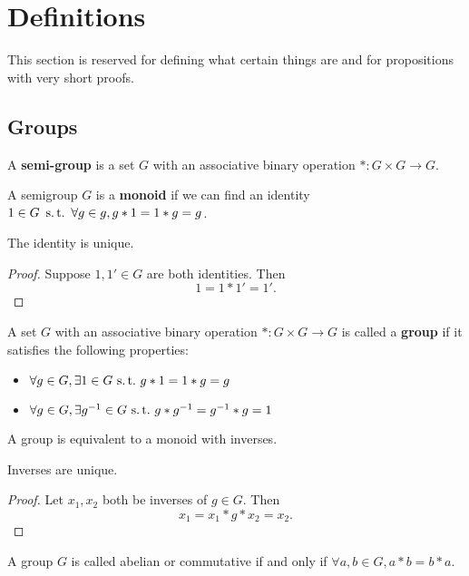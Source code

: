 \section{Definitions}
This section is reserved for defining what certain things are and for
propositions with very short proofs.

\subsection{Groups}
\begin{df}
A \textbf{semi-group} is a set $G$ with an associative binary operation $* : G
\times G \rightarrow G$.
\end{df}

\begin{df}
A semigroup $G$ is a \textbf{monoid} if we can find an identity $1 \in G \, \,\operatorname{s.t.}\,
\, \forall g \in g, g * 1 = 1 * g = g$.
\end{df}

\begin{prop}
The identity is unique.
\end{prop}
\begin{proof}
Suppose $1, 1' \in G$ are both identities. Then
\[ 1 = 1 * 1' = 1'. \]
\end{proof}

\begin{df}
A set $G$ with an associative binary operation $* : G \times G
\rightarrow G$ is called a \textbf{group} if it satisfies the following
properties:
\begin{itemize}
\item $\forall g \in G, \exists 1 \in G \,\operatorname{s.t.}\, g * 1 = 1 * g = g$
\item $\forall g \in G, \exists g^{-1} \in G \,\operatorname{s.t.}\, g * g^{-1} = g^{-1} * g
= 1$
\end{itemize}
\end{df}
\begin{rem}
A group is equivalent to a monoid with inverses.
\end{rem}
\begin{prop}
Inverses are unique.
\end{prop}
\begin{proof}
Let $x_1, x_2$ both be inverses of $g \in G$. Then
\[ x_1 = x_1 * g * x_2 = x_2. \]
\end{proof}

\begin{df}
A group $G$ is called abelian or commutative if and only if $\forall a,
b \in G, a * b = b * a$.
\end{df}

